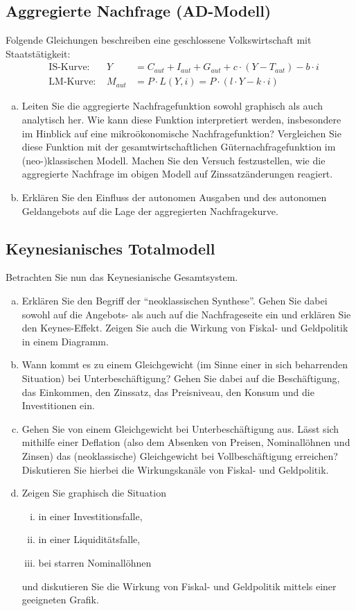 \documentclass{scrartcl}
\begin{document}
\subsection{Aggregierte Nachfrage (AD-Modell)} Folgende
Gleichungen beschreiben eine geschlossene Volkswirtschaft mit
Staatstätigkeit:
\begin{align*}
&\text{IS-Kurve: }& Y &= C_{aut} + I_{aut} + G_{aut} + c\cdot (Y-T_{aut}) -b \cdot i\\
&\text{LM-Kurve: }& M_{aut} &= P\cdot L(Y,i) = P\cdot (l \cdot Y - k \cdot i)
\end{align*}
\begin{enumerate}[(a)]
	\item Leiten Sie die aggregierte Nachfragefunktion sowohl graphisch als auch analytisch her. Wie kann diese Funktion interpretiert werden, insbesondere im Hinblick auf eine mikroökonomische Nachfragefunktion? Vergleichen Sie diese Funktion mit der gesamtwirtschaftlichen Güternachfragefunktion im (neo-)klassischen Modell. Machen Sie den Versuch festzustellen, wie die aggregierte Nachfrage im obigen Modell auf Zinssatzänderungen reagiert.
	\item Erklären Sie den Einfluss der autonomen Ausgaben und des autonomen Geldangebots auf die Lage der aggregierten Nachfragekurve.
\end{enumerate}

\subsection{Keynesianisches Totalmodell}
Betrachten Sie nun das Keynesianische Gesamtsystem.
\begin{enumerate}[(a)]
	\item Erklären Sie den Begriff der \enquote{neoklassischen Synthese}. Gehen Sie dabei sowohl auf die Angebots- als auch auf die Nachfrageseite ein und erklären Sie den Keynes-Effekt. Zeigen Sie auch die Wirkung von Fiskal- und Geldpolitik in einem Diagramm.
	\item Wann kommt es zu einem Gleichgewicht (im Sinne einer in sich beharrenden Situation) bei Unterbeschäftigung? Gehen Sie dabei auf die Beschäftigung, das Einkommen, den Zinssatz, das Preisniveau, den Konsum und die Investitionen ein.
	\item Gehen Sie von einem Gleichgewicht bei Unterbeschäftigung aus. Lässt sich mithilfe einer Deflation (also dem Absenken von Preisen, Nominallöhnen und Zinsen) das (neoklassische) Gleichgewicht bei Vollbeschäftigung erreichen? Diskutieren Sie hierbei die Wirkungskanäle von Fiskal- und Geldpolitik.
	\item Zeigen Sie graphisch die Situation
	\begin{enumerate}[(i)]
		\item in einer Investitionsfalle,
		\item in einer Liquiditätsfalle,
		\item bei starren Nominallöhnen
	\end{enumerate}
	und diskutieren Sie die Wirkung von Fiskal- und Geldpolitik mittels einer geeigneten Grafik.
\end{enumerate}
\end{document}

